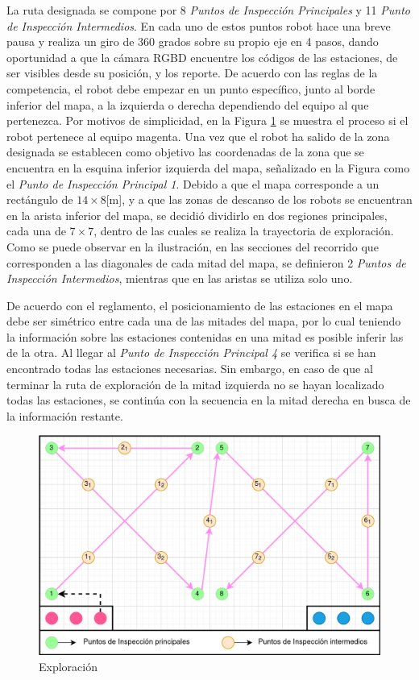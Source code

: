 La ruta designada se compone por 8 \textit{Puntos de Inspección Principales} y 11 \textit{Punto de Inspección Intermedios}. En cada uno de estos puntos robot hace una breve pausa y realiza un giro de 360 grados sobre su propio eje en 4 pasos, dando oportunidad a que la cámara RGBD encuentre los códigos de las estaciones, de ser visibles desde su posición, y los reporte. De acuerdo con las reglas de la competencia, el robot debe empezar en un punto específico, junto al borde inferior del mapa, a la izquierda o derecha dependiendo del equipo al que pertenezca. Por motivos de simplicidad, en la Figura \ref{fig:Route_Exploration} se muestra el proceso si el robot pertenece al equipo magenta.
Una vez que el robot ha salido de la zona designada se establecen como objetivo las coordenadas de la zona que se encuentra en la esquina inferior izquierda del mapa, señalizado en la Figura como el \textit{Punto de Inspección Principal 1}. 
Debido a que el mapa corresponde a un rectángulo de $14\times8$[m], y a que las zonas de descanso de los robots se encuentran en la arista inferior del mapa, se decidió dividirlo en dos regiones principales, cada una de $7\times7$, dentro de las cuales se realiza la trayectoria de exploración.  
Como se puede observar en la ilustración, en las secciones del recorrido que corresponden a las diagonales de cada mitad del mapa, se definieron 2 \textit{Puntos de Inspección Intermedios}, mientras que en las aristas se utiliza solo uno. 

De acuerdo con el reglamento, el posicionamiento de las estaciones en el mapa debe ser simétrico entre cada una de las mitades del mapa, por lo cual teniendo la información sobre las estaciones contenidas en una mitad es posible inferir las de la otra. Al llegar al \textit{Punto de Inspección Principal 4} se verifica si se han encontrado todas las estaciones necesarias. Sin embargo, en caso de que al terminar la ruta de exploración de la mitad izquierda no se hayan localizado todas las estaciones, se continúa con la secuencia en la mitad derecha en busca de la información restante. 

\begin{figure}[ht]
    \centering
    \includegraphics[scale= 0.3]{Figures/Exploration_route.png}
        \caption{Exploración}
        \label{fig:Route_Exploration}
    \end{figure}

